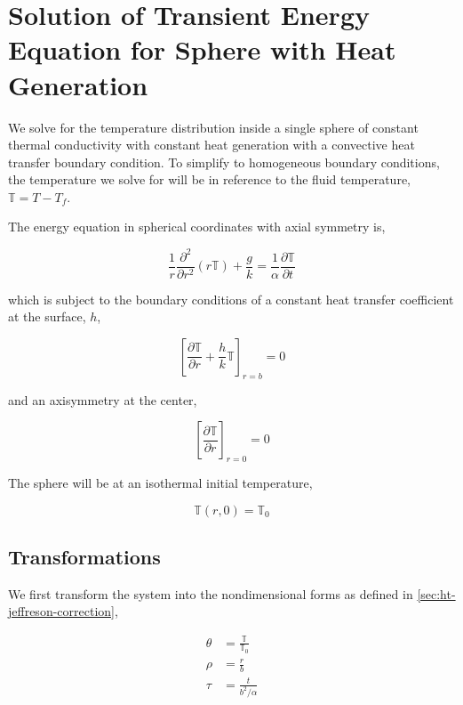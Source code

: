 \chapter{Solution of Transient Energy Equation for Sphere with Heat Generation}\label{sec:analytic-sphere-details}

We solve for the temperature distribution inside a single sphere of constant thermal conductivity with constant heat generation with a convective heat transfer boundary condition. To simplify to homogeneous boundary conditions, the temperature we solve for will be in reference to the fluid temperature, $\mathbb{T} = T-T_f$. 

The energy equation in spherical coordinates with axial symmetry is,

\begin{equation}
    \frac{1}{r}\frac{\partial^2}{\partial r^2}(r\mathbb{T}) + \frac{g}{k} = \frac{1}{\alpha}\frac{\partial \mathbb{T}}{\partial t}
\end{equation}

which is subject to the boundary conditions of a constant heat transfer coefficient at the surface, $h$,

\begin{equation}
    \left[\frac{\partial \mathbb{T}}{\partial r} + \frac{h}{k}\mathbb{T}\right]_{r=b} = 0
\end{equation}

and an axisymmetry at the center,

\begin{equation}
    \left[\frac{\partial \mathbb{T}}{\partial r}\right]_{r=0} = 0
\end{equation}

The sphere will be at an isothermal initial temperature,

\begin{equation}
    \mathbb{T}(r,0) = \mathbb{T}_0
\end{equation}





\section{Transformations}

We first transform the system into the nondimensional forms as defined in \cref{sec:ht-jeffreson-correction},

\begin{align*}
    \theta &= \frac{\mathbb{T}}{\mathbb{T}_0}\\
    \rho & = \frac{r}{b}\\
    \tau & = \frac{t}{b^2/\alpha}
\end{align*}

